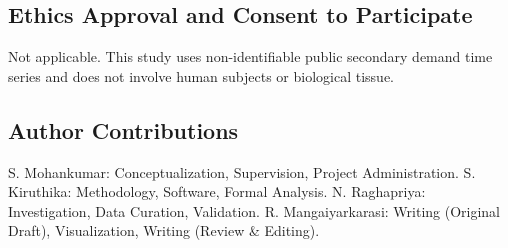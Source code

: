 \documentclass[11pt,a4paper]{article}
\begin{document}
\subsection*{Ethics Approval and Consent to Participate}
Not applicable. This study uses non-identifiable public secondary demand time series and does not involve human subjects or biological tissue.

\subsection*{Author Contributions}
S. Mohankumar: Conceptualization, Supervision, Project Administration. S. Kiruthika: Methodology, Software, Formal Analysis. N. Raghapriya: Investigation, Data Curation, Validation. R. Mangaiyarkarasi: Writing (Original Draft), Visualization, Writing (Review \& Editing).



\end{document}

